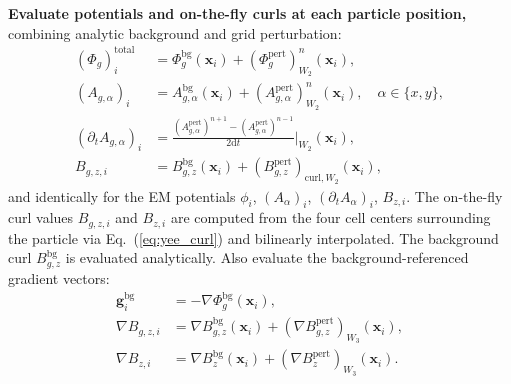 \documentclass[11pt,a4paper]{article}
\newcommand{\vv}[1]{\mathbf{#1}}
\newcommand{\Phig}{\Phi_g}
\newcommand{\dd}{\mathrm{d}}
\begin{document}
\begin{algsteps}
  \item \textbf{Evaluate potentials and on-the-fly curls at each particle position,} combining analytic background and grid perturbation:
  \begin{align}
    (\Phig)_{i}^{\mathrm{total}}    &= \Phig^{\mathrm{bg}}(\vv{x}_i) + (\Phig^{\mathrm{pert}})^n_{W_2}(\vv{x}_i), \\
    (A_{g,\alpha})_i            &= A_{g,\alpha}^{\mathrm{bg}}(\vv{x}_i) + (A_{g,\alpha}^{\mathrm{pert}})^n_{W_2}(\vv{x}_i), \quad\alpha\in\{x,y\}, \\
    (\partial_t A_{g,\alpha})_i &= \frac{(A_{g,\alpha}^{\mathrm{pert}})^{n+1} - (A_{g,\alpha}^{\mathrm{pert}})^{n-1}}{2\dd t}\bigg|_{W_2}(\vv{x}_i), \\
    B_{g,z,i}                   &= B_{g,z}^{\mathrm{bg}}(\vv{x}_i) + (B_{g,z}^{\mathrm{pert}})_{\mathrm{curl},W_2}(\vv{x}_i),
  \end{align}
  and identically for the EM potentials $\phi_i$, $(A_\alpha)_i$, $(\partial_t A_\alpha)_i$, $B_{z,i}$.  The on-the-fly curl values $B_{g,z,i}$ and $B_{z,i}$ are computed from the four cell centers surrounding the particle via Eq.~(\ref{eq:yee_curl}) and bilinearly interpolated.  The background curl $B_{g,z}^{\mathrm{bg}}$ is evaluated analytically.  Also evaluate the background-referenced gradient vectors:
  \begin{align}
    \vv{g}_i^{\mathrm{bg}}    &= -\nabla\Phig^{\mathrm{bg}}(\vv{x}_i), \\
    \nabla B_{g,z,i}          &= \nabla B_{g,z}^{\mathrm{bg}}(\vv{x}_i) + (\nabla B_{g,z}^{\mathrm{pert}})_{W_3}(\vv{x}_i), \\
    \nabla B_{z,i}            &= \nabla B_z^{\mathrm{bg}}(\vv{x}_i) + (\nabla B_z^{\mathrm{pert}})_{W_3}(\vv{x}_i).
  \end{align}


\end{algsteps}
\end{document}
